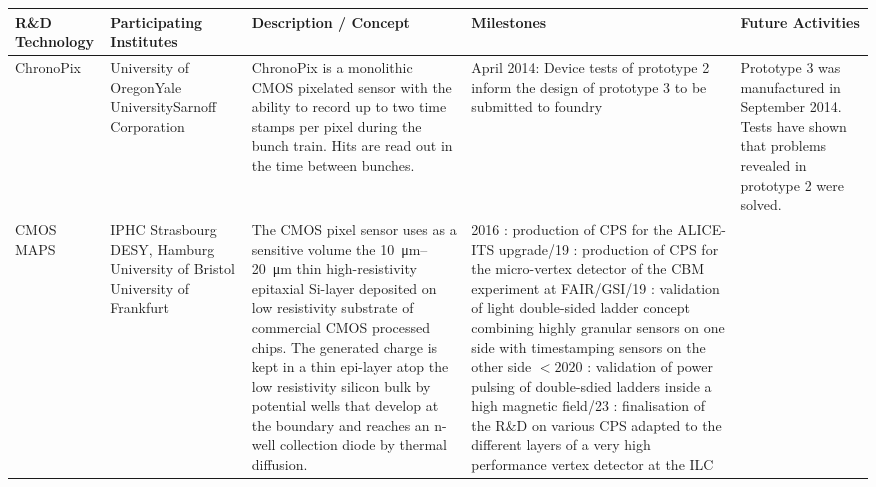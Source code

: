 \thispagestyle{empty}
\begin{landscape}
    \centering
    \begin{adjustbox}{max width=1.1\textwidth,totalheight=1\textheight}
\begin{tabularx}{2\textheight}{lXXXX}
    \toprule
    R\&D Technology & Participating Institutes & Description / Concept & Milestones & Future Activities \\
    \midrule
        ChronoPix &
        University of Oregon\newline Yale University\newline Sarnoff Corporation &
        ChronoPix is a monolithic CMOS pixelated sensor with the ability to record up to two time stamps per pixel during the bunch train. Hits are read out in the time between bunches. &
        April 2014: Device tests of prototype 2 inform the design of prototype 3 to be submitted to foundry &
        Prototype 3 was manufactured in September 2014. Tests have shown that problems revealed in prototype 2 were solved. \\
    \midrule
        CMOS MAPS &
        IPHC Strasbourg \newline DESY, Hamburg \newline University of Bristol \newline University of Frankfurt &
        The CMOS pixel sensor uses as a sensitive volume the \SIrange{10}{20}{\micro\meter} thin high-resistivity epitaxial Si-layer deposited on low resistivity substrate of commercial CMOS processed chips. The generated charge is kept in a thin epi-layer atop the low resistivity silicon bulk by potential wells that develop at the boundary and reaches an n-well collection diode by thermal diffusion. &
        2016 : production of CPS for the ALICE-ITS upgrade\newline
        2018/19 : production of CPS for the micro-vertex detector of the CBM experiment at FAIR/GSI\newline
        2018/19 : validation of light double-sided ladder concept combining highly granular sensors on one side with timestamping sensors on the other side\newline
        $< 2020$ : validation of power pulsing of double-sdied ladders inside a high magnetic field\newline
        2022/23 : finalisation of the R\&D on various CPS adapted to the different layers of a very high performance vertex detector at the ILC &

\end{tabularx}
\end{adjustbox}
\end{landscape}
